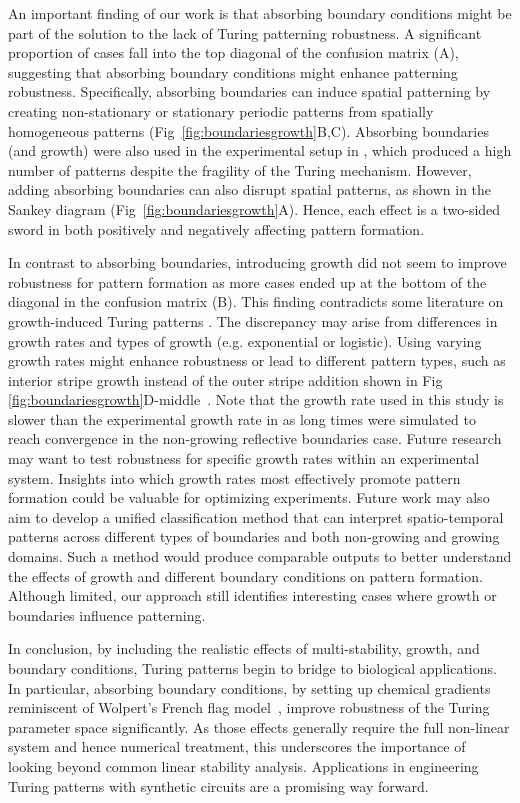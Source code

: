 \documentclass[10pt,letterpaper]{article}
\begin{document}
An important finding of our work is that absorbing boundary conditions might be part of the solution to the lack of Turing patterning robustness. A significant proportion of cases fall into the top diagonal of the confusion matrix (A), suggesting that absorbing boundary conditions might enhance patterning robustness.
Specifically, absorbing boundaries can induce spatial patterning by creating non-stationary or stationary periodic patterns from spatially homogeneous patterns (Fig~\ref{fig:boundariesgrowth}B,C). Absorbing boundaries (and growth) were also used in the experimental setup in \cite{Oliver2023}, which produced a high number of patterns despite the fragility of the Turing mechanism. However, adding absorbing boundaries can also disrupt spatial patterns, as shown in the Sankey diagram (Fig~\ref{fig:boundariesgrowth}A). Hence, each effect is a two-sided sword in both positively and negatively affecting pattern formation.

In contrast to absorbing boundaries, introducing growth did not seem to improve robustness for pattern formation as more cases ended up at the bottom of the diagonal in the confusion matrix (B).
This finding contradicts some literature on growth-induced Turing patterns \cite{gaffney2010}.
The discrepancy may arise from differences in growth rates and types of growth (e.g. exponential or logistic).
Using varying growth rates might enhance robustness or lead to different pattern types, such as interior stripe growth instead of the outer stripe addition shown in Fig \ref{fig:boundariesgrowth}D-middle~\cite{konow2019turing}. Note that the growth rate used in this study is slower than the experimental growth rate in \cite{Oliver2023} as long times were simulated to reach convergence in the non-growing reflective boundaries case. Future research may want to test robustness for specific growth rates within an experimental system. Insights into which growth rates most effectively promote pattern formation could be valuable for optimizing experiments.
Future work may also aim to develop a unified classification method that can interpret spatio-temporal patterns across different types of boundaries and both non-growing and growing domains. Such a method would produce comparable outputs to better understand the effects of growth and different boundary conditions on pattern formation.
Although limited, our approach still identifies interesting cases where growth or boundaries influence patterning.


In conclusion, by including the realistic effects of multi-stability, growth, and boundary conditions, Turing patterns begin to bridge to biological applications. In particular, absorbing boundary conditions, by setting up chemical gradients reminiscent of Wolpert's French flag model~\cite{wolpert1969positional}, improve robustness of the Turing parameter space significantly. As those effects generally require the full non-linear system and hence numerical treatment, this underscores the importance of looking beyond common linear stability analysis. Applications in engineering Turing patterns with synthetic circuits are a promising way forward.
\end{document}

